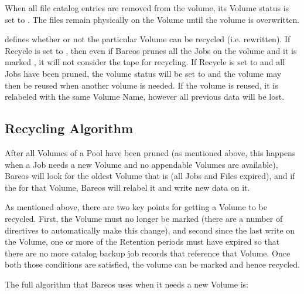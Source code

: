 \begin{description}
   When all file catalog entries are removed from the volume,  its Volume status is
   set to . The files remain physically  on the Volume until the
   volume is overwritten.

\item[\linkResourceDirective{Dir}{Pool}{Recycle}]
   defines whether or not the particular Volume can be
   recycled (i.e.  rewritten).  If Recycle is set to ,
   then even if Bareos prunes all the Jobs on the volume and it
   is marked , it will not consider the tape for recycling.  If
   Recycle is set to  and all Jobs have been pruned, the volume
   status will be set to  and the volume may then be reused
   when another volume is needed.  If the volume is reused, it is relabeled
   with the same Volume Name, however all previous data will be lost.
\end{description}


\subsection{Recycling Algorithm}
\label{RecyclingAlgorithm}
\label{Recycling}


After all Volumes of a Pool have been pruned (as mentioned above, this happens
when a Job needs a new Volume and no appendable Volumes are available), Bareos
will look for the oldest Volume that is  (all Jobs and Files expired),
and if the  for that Volume, Bareos will
relabel it and write new data on it.

As mentioned above, there are two key points for getting a Volume
to be recycled. First, the Volume must no longer be marked  (there
are a number of directives to automatically make this change), and second
since the last write on the Volume, one or more of the Retention periods
must have expired so that there are no more catalog backup job records
that reference that Volume.  Once both those conditions are satisfied,
the volume can be marked  and hence recycled.

The full algorithm that Bareos uses when it needs a new Volume is:

